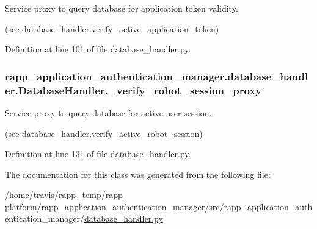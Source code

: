 Service proxy to query database for application token validity. 

(see database\-\_\-handler.\-verify\-\_\-active\-\_\-application\-\_\-token) 

Definition at line 101 of file database\-\_\-handler.\-py.

\hypertarget{classrapp__application__authentication__manager_1_1database__handler_1_1DatabaseHandler_a9e58d8759993da8626073ecc804638df}{
\subsubsection[{\-\_\-verify\-\_\-robot\-\_\-session\-\_\-proxy}]{\setlength{\rightskip}{0pt plus 5cm}rapp\-\_\-application\-\_\-authentication\-\_\-manager.\-database\-\_\-handler.\-Database\-Handler.\-\_\-verify\-\_\-robot\-\_\-session\-\_\-proxy\hspace{0.3cm}{\ttfamily [private]}}}\label{classrapp__application__authentication__manager_1_1database__handler_1_1DatabaseHandler_a9e58d8759993da8626073ecc804638df}


Service proxy to query database for active user session. 

(see database\-\_\-handler.\-verify\-\_\-active\-\_\-robot\-\_\-session) 

Definition at line 131 of file database\-\_\-handler.\-py.



The documentation for this class was generated from the following file\-:\begin{DoxyCompactItemize}
\item 
/home/travis/rapp\-\_\-temp/rapp-\/platform/rapp\-\_\-application\-\_\-authentication\-\_\-manager/src/rapp\-\_\-application\-\_\-authentication\-\_\-manager/\hyperlink{database__handler_8py}{database\-\_\-handler.\-py}\end{DoxyCompactItemize}
